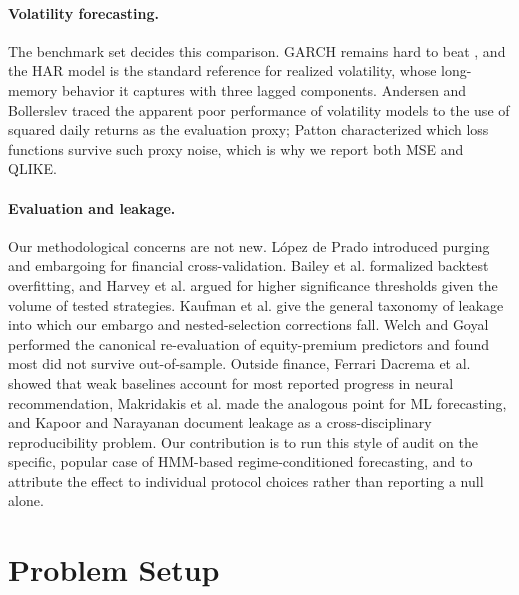 \documentclass[sigconf,nonacm]{acmart}
\begin{document}
\paragraph{Volatility forecasting.}
The benchmark set decides this comparison. GARCH \cite{engle1982,
bollerslev1986} remains hard to beat \cite{hansen2005forecast}, and the HAR
model \cite{corsi2009} is the standard reference for realized volatility, whose
long-memory behavior it captures with three lagged components. Andersen and
Bollerslev \cite{andersen1998} traced the apparent poor performance of volatility
models to the use of squared daily returns as the evaluation proxy; Patton
\cite{patton2011} characterized which loss functions survive such proxy noise,
which is why we report both MSE and QLIKE.

\paragraph{Evaluation and leakage.}
Our methodological concerns are not new. L\'opez de Prado \cite{lopezdeprado2018}
introduced purging and embargoing for financial cross-validation. Bailey et al.
\cite{bailey2014} formalized backtest overfitting, and Harvey et al.
\cite{harvey2016} argued for higher significance thresholds given the volume of
tested strategies. Kaufman et al. \cite{kaufman2012leakage} give the general
taxonomy of leakage into which our embargo and nested-selection corrections fall. Welch and Goyal \cite{welch2008} performed the canonical
re-evaluation of equity-premium predictors and found most did not survive
out-of-sample. Outside finance, Ferrari Dacrema et al. \cite{dacrema2019} showed
that weak baselines account for most reported progress in neural recommendation,
Makridakis et al. \cite{makridakis2018} made the analogous point for ML
forecasting, and Kapoor and Narayanan \cite{kapoor2023leakage} document leakage
as a cross-disciplinary reproducibility problem. Our contribution is to run this
style of audit on the specific, popular case of HMM-based regime-conditioned
forecasting, and to attribute the effect to individual protocol choices rather
than reporting a null alone.

\section{Problem Setup}
\end{document}
